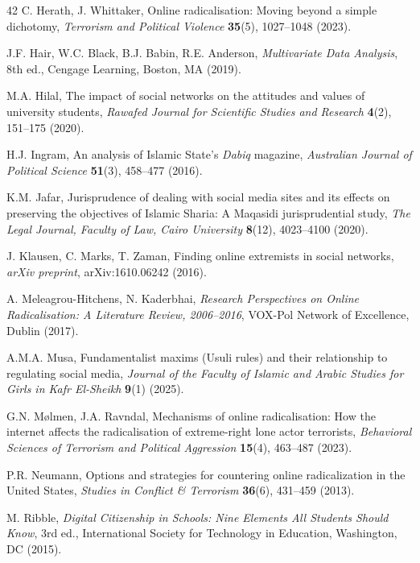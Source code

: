 \documentclass[10pt]{NSP1}
\begin{document}
\begin{thebibliography}{42}
		 C. Herath, J. Whittaker, Online radicalisation: Moving beyond a simple dichotomy, \textit{Terrorism and Political Violence} \textbf{35}(5), 1027–1048 (2023).
		
		 J.F. Hair, W.C. Black, B.J. Babin, R.E. Anderson, \textit{Multivariate Data Analysis}, 8th ed., Cengage Learning, Boston, MA (2019).
		
		 M.A. Hilal, The impact of social networks on the attitudes and values of university students, \textit{Rawafed Journal for Scientific Studies and Research} \textbf{4}(2), 151–175 (2020).
		
		 H.J. Ingram, An analysis of Islamic State's \textit{Dabiq} magazine, \textit{Australian Journal of Political Science} \textbf{51}(3), 458–477 (2016).
		
		 K.M. Jafar, Jurisprudence of dealing with social media sites and its effects on preserving the objectives of Islamic Sharia: A Maqasidi jurisprudential study, \textit{The Legal Journal, Faculty of Law, Cairo University} \textbf{8}(12), 4023–4100 (2020).
		
		 J. Klausen, C. Marks, T. Zaman, Finding online extremists in social networks, \textit{arXiv preprint}, arXiv:1610.06242 (2016).
		
		 A. Meleagrou-Hitchens, N. Kaderbhai, \textit{Research Perspectives on Online Radicalisation: A Literature Review, 2006–2016}, VOX-Pol Network of Excellence, Dublin (2017).
		
		 A.M.A. Musa, Fundamentalist maxims (Usuli rules) and their relationship to regulating social media, \textit{Journal of the Faculty of Islamic and Arabic Studies for Girls in Kafr El-Sheikh} \textbf{9}(1) (2025).
		
		 G.N. M\o lmen, J.A. Ravndal, Mechanisms of online radicalisation: How the internet affects the radicalisation of extreme-right lone actor terrorists, \textit{Behavioral Sciences of Terrorism and Political Aggression} \textbf{15}(4), 463–487 (2023).
		
		 P.R. Neumann, Options and strategies for countering online radicalization in the United States, \textit{Studies in Conflict \& Terrorism} \textbf{36}(6), 431–459 (2013).
		
		 M. Ribble, \textit{Digital Citizenship in Schools: Nine Elements All Students Should Know}, 3rd ed., International Society for Technology in Education, Washington, DC (2015).
		

\end{thebibliography}
\end{document}
